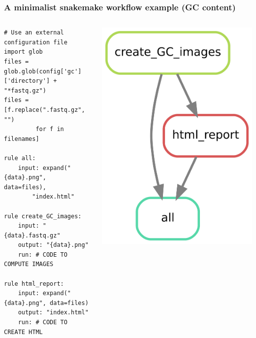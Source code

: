 \documentclass{beamer}
\begin{document}
\begin{frame}[fragile]
\frametitle{A minimalist snakemake workflow example (GC content)} 
\centering

\begin{columns}
 \begin{column}{7.2cm}
 \hspace{-2cm}
\begin{lstlisting}
# Use an external configuration file
import glob
files = glob.glob(config['gc']['directory'] + "*fastq.gz")
files = [f.replace(".fastq.gz", "") 
         for f in filenames]

rule all:
    input: expand("{data}.png", data=files), 
        "index.html"

rule create_GC_images:
    input: "{data}.fastq.gz"
    output: "{data}.png"
    run: # CODE TO COMPUTE IMAGES
        
rule html_report:
    input: expand("{data}.png", data=files)
    output: "index.html"
    run: # CODE TO CREATE HTML 
\end{lstlisting} 
\end{column}
\begin{column}{3.9cm}
\hspace{1cm}
 \includegraphics[scale=2.2]{./images/gc.png}
\end{column}
\end{columns}
\end{frame}
\end{document}
